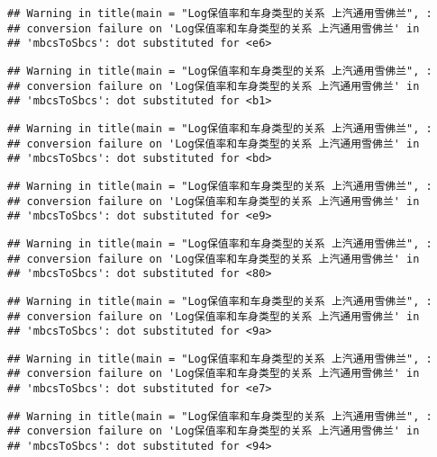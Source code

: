 \documentclass[]{article}
\begin{document}
\begin{verbatim}
## Warning in title(main = "Log保值率和车身类型的关系 上汽通用雪佛兰", :
## conversion failure on 'Log保值率和车身类型的关系 上汽通用雪佛兰' in
## 'mbcsToSbcs': dot substituted for <e6>
\end{verbatim}

\begin{verbatim}
## Warning in title(main = "Log保值率和车身类型的关系 上汽通用雪佛兰", :
## conversion failure on 'Log保值率和车身类型的关系 上汽通用雪佛兰' in
## 'mbcsToSbcs': dot substituted for <b1>
\end{verbatim}

\begin{verbatim}
## Warning in title(main = "Log保值率和车身类型的关系 上汽通用雪佛兰", :
## conversion failure on 'Log保值率和车身类型的关系 上汽通用雪佛兰' in
## 'mbcsToSbcs': dot substituted for <bd>
\end{verbatim}

\begin{verbatim}
## Warning in title(main = "Log保值率和车身类型的关系 上汽通用雪佛兰", :
## conversion failure on 'Log保值率和车身类型的关系 上汽通用雪佛兰' in
## 'mbcsToSbcs': dot substituted for <e9>
\end{verbatim}

\begin{verbatim}
## Warning in title(main = "Log保值率和车身类型的关系 上汽通用雪佛兰", :
## conversion failure on 'Log保值率和车身类型的关系 上汽通用雪佛兰' in
## 'mbcsToSbcs': dot substituted for <80>
\end{verbatim}

\begin{verbatim}
## Warning in title(main = "Log保值率和车身类型的关系 上汽通用雪佛兰", :
## conversion failure on 'Log保值率和车身类型的关系 上汽通用雪佛兰' in
## 'mbcsToSbcs': dot substituted for <9a>
\end{verbatim}

\begin{verbatim}
## Warning in title(main = "Log保值率和车身类型的关系 上汽通用雪佛兰", :
## conversion failure on 'Log保值率和车身类型的关系 上汽通用雪佛兰' in
## 'mbcsToSbcs': dot substituted for <e7>
\end{verbatim}

\begin{verbatim}
## Warning in title(main = "Log保值率和车身类型的关系 上汽通用雪佛兰", :
## conversion failure on 'Log保值率和车身类型的关系 上汽通用雪佛兰' in
## 'mbcsToSbcs': dot substituted for <94>
\end{verbatim}
\end{document}

